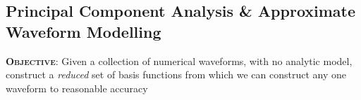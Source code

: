 \documentclass[a0,landscape]{a0poster}
\begin{document}
\begin{multicols}{4}
%
%
%

\section*{\centering Principal Component Analysis \& Approximate Waveform Modelling}

{\bf \textsc{Objective}}: Given a collection of numerical waveforms, with no analytic
model, construct a \emph{reduced} set of basis functions from which we can
construct any one waveform to reasonable accuracy


\end{multicols}
\end{document}
